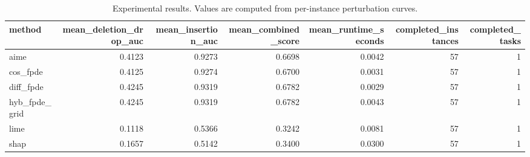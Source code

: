 \begin{table}[t]
\caption{Experimental results. Values are computed from per-instance perturbation curves.}
\label{tab:main_results_computed}
\centering
\begin{tabular}{lrrrrrr}
\toprule
method & mean\_deletion\_drop\_auc & mean\_insertion\_auc & mean\_combined\_score & mean\_runtime\_seconds & completed\_instances & completed\_tasks \\
\midrule
aime & 0.4123 & 0.9273 & 0.6698 & 0.0042 & 57 & 1 \\
cos\_fpde & 0.4125 & 0.9274 & 0.6700 & 0.0031 & 57 & 1 \\
diff\_fpde & 0.4245 & 0.9319 & 0.6782 & 0.0029 & 57 & 1 \\
hyb\_fpde\_grid & 0.4245 & 0.9319 & 0.6782 & 0.0043 & 57 & 1 \\
lime & 0.1118 & 0.5366 & 0.3242 & 0.0081 & 57 & 1 \\
shap & 0.1657 & 0.5142 & 0.3400 & 0.0300 & 57 & 1 \\
\bottomrule
\end{tabular}

\end{table}

